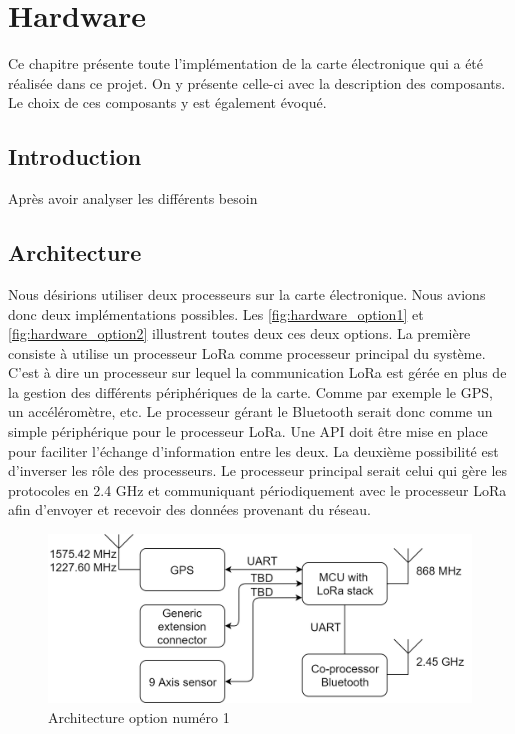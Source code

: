 \chapter{Hardware}
\label{3_hardware}

Ce chapitre présente toute l'implémentation de la carte électronique qui a été réalisée dans ce projet. On y présente celle-ci avec la description des composants. Le choix de ces composants y est également évoqué.


\section{Introduction}

Après avoir analyser les différents besoin 



\section{Architecture}

Nous désirions utiliser deux processeurs sur la carte électronique. Nous avions donc deux implémentations possibles. Les \autoref{fig:hardware_option1} et \autoref{fig:hardware_option2} illustrent toutes deux ces deux options. La première consiste à utilise un processeur LoRa comme processeur principal du système. C'est à dire un processeur sur lequel la communication LoRa est gérée en plus de la gestion des différents périphériques de la carte. Comme par exemple le GPS, un accéléromètre, etc. Le processeur gérant le Bluetooth serait donc comme un simple périphérique pour le processeur LoRa. Une API doit être mise en place pour faciliter l'échange d'information entre les deux. La deuxième possibilité est d'inverser les rôle des processeurs. Le processeur principal serait celui qui gère les protocoles en 2.4 GHz et communiquant périodiquement avec le processeur LoRa afin d'envoyer et recevoir des données provenant du réseau.

\begin{figure}[ht!]
    \centering
    \includegraphics[width=\textwidth]{Figures/hardware/master_onepage_option1.png}
    \caption{Architecture option numéro 1}
    \label{fig:hardware_option1}
\end{figure}

